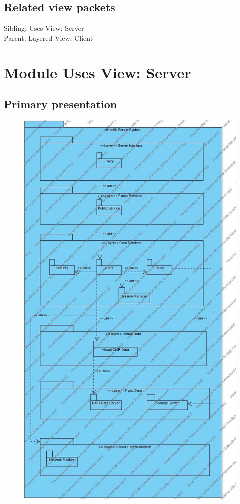 \documentclass[a4paper,10pt]{article}
\begin{document}
\subsection{Related view packets}

Sibling: Uses View: Server\\
Parent: Layered View: Client\\

\section{Module Uses View: Server}
\label{Module Uses View : Server}

\subsection{Primary presentation}
\begin{center}
    \begin{figure}[h!]
      \includegraphics[height=\textheight]{../images/UsesView_Server.jpg}
    \end{figure}
  \end{center}
\end{document}

